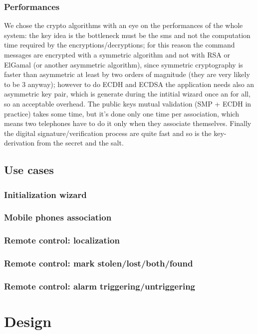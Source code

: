 \documentclass[a4paper,12pt]{article}
\begin{document}
\subsubsection{Performances}
We chose the crypto algorithms with an eye on the performances of the whole system: the key idea is the bottleneck must be the sms and not the computation time required by the encryptions/decryptions; for this reason the command messages are encrypted with a symmetric algorithm and not with RSA or ElGamal (or another asymmetric algorithm), since symmetric cryptography is faster than asymmetric at least by two orders of magnitude (they are very likely to be 3 anyway); however to do ECDH and ECDSA the application needs also an asymmetric key pair, which is generate during the intitial wizard once an for all, so an acceptable overhead. The public keys mutual validation (SMP + ECDH in practice) takes some time, but it's done only one time per association, which means two telephones have to do it only when they associate themselves. Finally the digital signature/verification process are quite fast and so is the key-derivation from the secret and the salt.
\subsection{Use cases}
\subsubsection{Initialization wizard}
\subsubsection{Mobile phones association}
\subsubsection{Remote control: localization}
\subsubsection{Remote control: mark stolen/lost/both/found}
\subsubsection{Remote control: alarm triggering/untriggering}
\clearpage

\noindent	
\Huge{\section{Design}}
\end{document}
